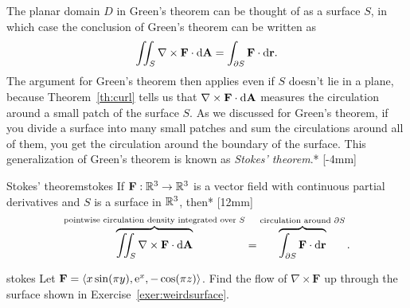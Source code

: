 \documentclass[prettycode,shellescape]{watsonbook}
\begin{document}
The planar domain $D$ in Green's theorem can be thought of as a
surface $S$, in which case the conclusion of Green's theorem can be
written as
\[
  \iint_S \nabla \times \mathbf{F} \cdot
  \mathrm{d}\mathbf{A} =
  \int_{\partial S} \mathbf{F} \cdot
  \mathrm{d}\mathbf{r}. 
\]
The argument for Green's theorem then applies even if $S$ doesn't lie
in a plane, because Theorem~\ref{th:curl} tells us that
$\nabla \times \mathbf{F} \cdot \mathrm{d}\mathbf{A}$ measures the circulation
around a small patch of the surface $S$. As we discussed for Green's
theorem, if you divide a surface into many small patches and sum the
circulations around all of them, you get the circulation around the
boundary of the surface.  This generalization of Green's theorem is
known as \textit{Stokes' theorem}.* [-4mm]

\begin{theo}{Stokes' theorem}{stokes} 
  If $\mathbf{F} : \mathbb{R}^3 \to \mathbb{R}^3$ is a vector field with continuous
  partial derivatives and $S$ is a surface in $\mathbb{R}^3$, then*
  [12mm]
  \[
    \overbrace{\iint_S \nabla \times \mathbf{F} \cdot
      \mathrm{d}\mathbf{A}}^{\text{pointwise circulation density integrated
        over $S$}} =
    \overbrace{\int_{\partial S} \mathbf{F} \cdot
      \mathrm{d}\mathbf{r}}^{\text{circulation around $\partial S$}}. 
  \]
\end{theo}

\begin{example}{}{stokes}
  Let $\mathbf{F} = \langle x \sin (\pi y), \mathrm{e}^x, -\cos(\pi z)
  \rangle$. Find the flow of $\nabla \times \mathbf{F}$ up through the
  surface shown in Exercise~\ref{exer:weirdsurface}.
\end{example}
\end{document}
